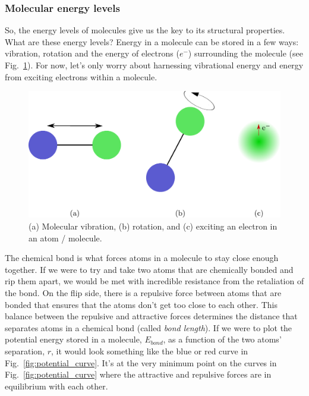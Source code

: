\documentclass[12pt]{article}
\begin{document}
\subsubsection{Molecular energy levels} \label{sec:molec_energy_lvls}

So, the energy levels of molecules give us the key to its structural properties. What are these energy levels? Energy in a molecule can be stored in a few ways: vibration, rotation and the energy of electrons ($e^-$) surrounding the molecule (see Fig.~\ref{fig:DOFs}). For now, let's only worry about harnessing vibrational energy and energy from exciting electrons within a molecule.

\begin{figure}
    \begin{center}
        \includegraphics[width=0.5\linewidth]{figures/molecule_DOFs.pdf}
    \end{center}
    \caption{
        (a) Molecular vibration, (b) rotation, and (c) exciting an electron in an atom / molecule.
    }
    \label{fig:DOFs}
\end{figure}

The chemical bond is what forces atoms in a molecule to stay close enough together. If we were to try and take two atoms that are chemically bonded and rip them apart, we would be met with incredible resistance from the retaliation of the bond. On the flip side, there is a repulsive force between atoms that are bonded that ensures that the atoms don't get too close to each other. This balance between the repulsive and attractive forces determines the distance that separates atoms in a chemical bond (called \textit{bond length}). If we were to plot the potential energy stored in a molecule, $E_{bond}$, as a function of the two atoms' separation, $r$, it would look something like the blue or red curve in Fig.~\ref{fig:potential_curve}. It's at the very minimum point on the curves in Fig.~\ref{fig:potential_curve} where the attractive and repulsive forces are in equilibrium with each other.
\end{document}
